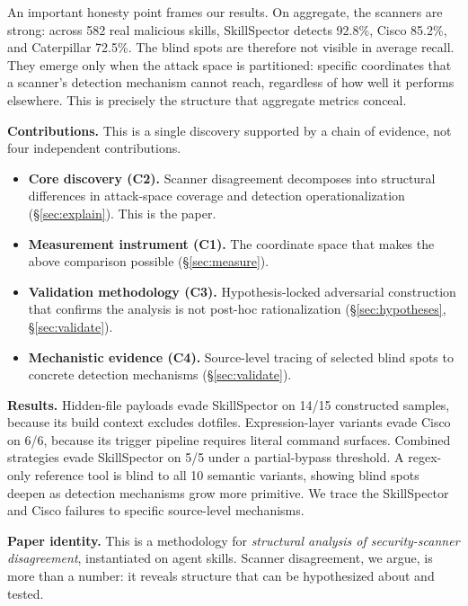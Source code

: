 \documentclass[sigconf,nonacm]{acmart}
\begin{document}
An important honesty point frames our results.
On aggregate, the scanners are strong: across 582 real malicious skills, SkillSpector detects 92.8\%, Cisco 85.2\%, and Caterpillar 72.5\%.
The blind spots are therefore not visible in average recall.
They emerge only when the attack space is partitioned: specific coordinates that a scanner's detection mechanism cannot reach, regardless of how well it performs elsewhere.
This is precisely the structure that aggregate metrics conceal.

\noindent\textbf{Contributions.} This is a single discovery supported by a chain of evidence, not four independent contributions.
\begin{itemize}
  \item \textbf{Core discovery (C2).} Scanner disagreement decomposes into structural differences in attack-space coverage and detection operationalization (\S\ref{sec:explain}). This is the paper.
  \item \textbf{Measurement instrument (C1).} The coordinate space that makes the above comparison possible (\S\ref{sec:measure}).
  \item \textbf{Validation methodology (C3).} Hypothesis-locked adversarial construction that confirms the analysis is not post-hoc rationalization (\S\ref{sec:hypotheses}, \S\ref{sec:validate}).
  \item \textbf{Mechanistic evidence (C4).} Source-level tracing of selected blind spots to concrete detection mechanisms (\S\ref{sec:validate}).
\end{itemize}

\noindent\textbf{Results.} Hidden-file payloads evade SkillSpector on 14/15 constructed samples, because its build context excludes dotfiles.
Expression-layer variants evade Cisco on 6/6, because its trigger pipeline requires literal command surfaces.
Combined strategies evade SkillSpector on 5/5 under a partial-bypass threshold.
A regex-only reference tool is blind to all 10 semantic variants, showing blind spots deepen as detection mechanisms grow more primitive.
We trace the SkillSpector and Cisco failures to specific source-level mechanisms.

\noindent\textbf{Paper identity.} This is a methodology for \emph{structural analysis of security-scanner disagreement}, instantiated on agent skills.
Scanner disagreement, we argue, is more than a number: it reveals structure that can be hypothesized about and tested.

\end{document}
